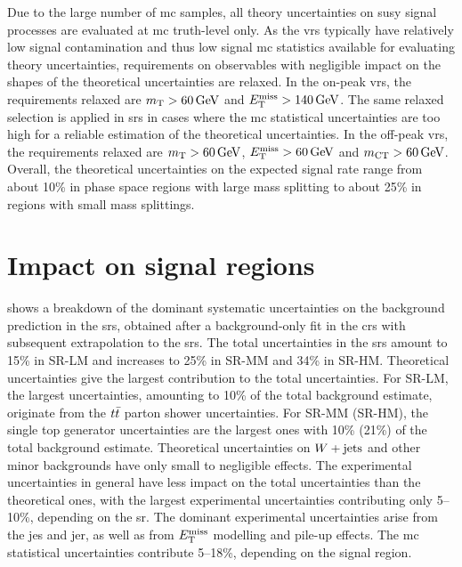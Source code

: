 Due to the large number of \gls{mc} samples, all theory uncertainties on \gls{susy} signal processes are evaluated at \gls{mc} truth-level only.
As the \glspl{vr} typically have relatively low signal contamination and thus low signal \gls{mc} statistics available for evaluating theory uncertainties, requirements on observables with negligible impact on the shapes of the theoretical uncertainties are relaxed.
In the on-peak \glspl{vr}, the requirements relaxed are $\mt>\SI{60}{\GeV}$ and $\etmiss > \SI{140}{\GeV}$.
The same relaxed selection is applied in \glspl{sr} in cases where the \gls{mc} statistical uncertainties are too high for a reliable estimation of the theoretical uncertainties.
In the off-peak \glspl{vr}, the requirements relaxed are $\mt>\SI{60}{\GeV}$, $\etmiss>\SI{60}{\GeV}$ and $\mct>\SI{60}{\GeV}$.
Overall, the theoretical uncertainties on the expected signal rate range from about 10\% in phase space regions with large mass splitting to about 25\% in regions with small mass splittings.
 
 
\section{Impact on signal regions}

 shows a breakdown of the dominant systematic uncertainties on the background prediction in the \glspl{sr}, obtained after a background-only fit in the \glspl{cr} with subsequent extrapolation to the \glspl{sr}.
The total uncertainties in the \glspl{sr} amount to 15\% in SR-LM and increases to 25\% in SR-MM and 34\% in SR-HM. Theoretical uncertainties give the largest contribution to the total uncertainties.
For SR-LM, the largest uncertainties, amounting to 10\% of the total background estimate, originate from the $t\bar{t}$ parton shower uncertainties.
For SR-MM (SR-HM), the single top generator uncertainties are the largest ones with 10\% (21\%) of the total background estimate.
Theoretical uncertainties on $W+\mathrm{jets}$ and other minor backgrounds have only small to negligible effects.
The experimental uncertainties in general have less impact on the total uncertainties than the theoretical ones, with the largest experimental uncertainties contributing only 5--10\%, depending on the \gls{sr}.
The dominant experimental uncertainties arise from the \gls{jes} and \gls{jer}, as well as from $E_{\textrm{T}}^{\textrm{miss}}$ modelling and pile-up effects.
The \gls{mc} statistical uncertainties contribute 5--18\%, depending on the signal region.  

